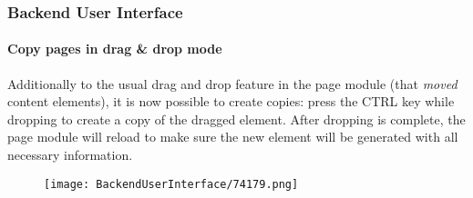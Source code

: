 \begin{frame}[fragile]
	\frametitle{Backend User Interface}
	\framesubtitle{Copy pages in drag \& drop mode}

	Additionally to the usual drag and drop feature in the page module (that \textit{moved} content elements),
	it is now possible to create copies: press the CTRL key while dropping to create a copy of the dragged
	element. After dropping is complete, the page module will reload to make sure the new element will be
	generated with all necessary information.

	\begin{figure}
		\texttt{[image: BackendUserInterface/74179.png]}
	\end{figure}

\end{frame}

